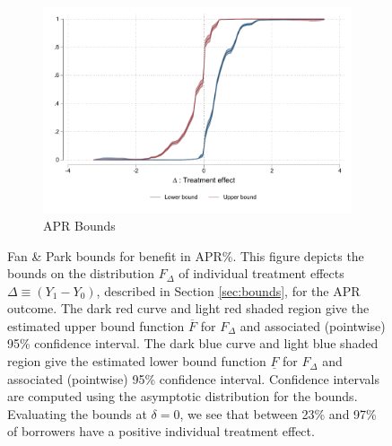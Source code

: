 \begin{appendix}
\begin{figure}[!h]
    \begin{center}
    \begin{subfigure}{0.55\textwidth}
        \caption{APR Bounds}
        \centering
        \includegraphics[width=\textwidth]{Figuras/fan_park_bounds_apr.pdf}
    \end{subfigure}
    \end{center}
        \caption{Fan \& Park bounds for benefit in APR\%.  This figure depicts the \cite{fan2010sharp} bounds on the distribution $F_\Delta$ of individual treatment effects $\Delta \equiv (Y_1 - Y_0)$, described in Section \ref{sec:bounds}, for the APR outcome.
    The dark red curve and light red shaded region give the estimated upper bound function $\overline{F}$ for $F_\Delta$ and associated (pointwise) 95\% confidence interval. 
    The dark blue curve and light blue shaded region give the estimated lower bound function $\underline{F}$ for $F_\Delta$ and associated (pointwise) 95\% confidence interval.
    Confidence intervals are computed using the asymptotic distribution for the bounds.  Evaluating the bounds at $\delta = 0$, we see that between 23\% and 97\% of borrowers have a positive individual treatment effect.}
     \label{fan_park_bounds}
\end{figure}



\begin{figure}
        

\end{figure}
\end{appendix}
